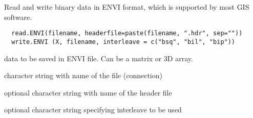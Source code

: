 \begin{Description}\relax
Read and write binary data in ENVI format, which is supported by 
most GIS software.
\end{Description}
\begin{Usage}
\begin{verbatim}
  read.ENVI(filename, headerfile=paste(filename, ".hdr", sep="")) 
  write.ENVI (X, filename, interleave = c("bsq", "bil", "bip")) 
\end{verbatim}
\end{Usage}
\begin{Arguments}
\begin{ldescription}
\item[\code{X}] data to be saved in ENVI file. Can be a matrix or 3D array.
\item[\code{filename}] character string with name of the file (connection)
\item[\code{headerfile}] optional character string with name of the header file
\item[\code{interleave}] optional character string specifying interleave to be used
\end{ldescription}
\end{Arguments}
